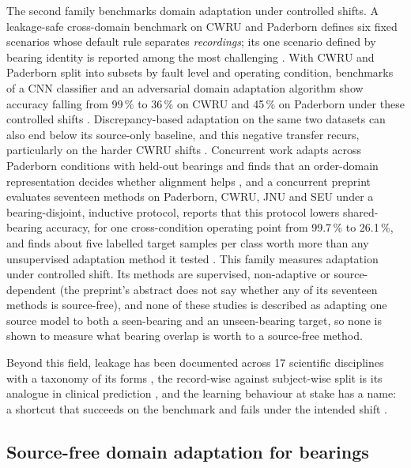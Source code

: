 The second family benchmarks domain adaptation under controlled shifts. A leakage-safe cross-domain benchmark on CWRU and
Paderborn defines six fixed scenarios whose default rule separates \emph{recordings}; its one scenario defined by bearing
identity is reported among the most challenging \cite{knap2026leakagesafe}. With CWRU and Paderborn split into subsets by
fault level and operating condition, benchmarks of a CNN classifier and an adversarial domain adaptation algorithm show accuracy falling from 99\,\% to 36\,\% on CWRU and
45\,\% on Paderborn under these controlled shifts \cite{farag2025benchmark}. Discrepancy-based adaptation on the same two datasets can also end below its source-only baseline, and this negative transfer recurs, particularly on the harder CWRU shifts \cite{knap2026negative}. Concurrent work adapts across Paderborn conditions with held-out
bearings and finds that an order-domain representation decides whether alignment helps \cite{nagaswetha2026}, and a
concurrent preprint evaluates seventeen methods on Paderborn, CWRU, JNU and SEU under a bearing-disjoint, inductive
protocol, reports that this protocol lowers shared-bearing accuracy, for one cross-condition operating point from 99.7\,\% to 26.1\,\%, and finds about five labelled target samples per class worth more than any unsupervised adaptation method it
tested \cite{duc2026recipe}. This family measures adaptation under controlled shift. Its methods are
supervised, non-adaptive or source-dependent (the preprint's abstract does not say whether any of its seventeen methods is source-free), and none of these studies is described as adapting one source model to both a seen-bearing and an unseen-bearing
target, so none is shown to measure what bearing overlap is worth to a source-free method.

Beyond this field, leakage has been documented across 17 scientific disciplines with a taxonomy of its forms
\cite{kapoor2023leakage}, the record-wise against subject-wise split is its analogue in clinical prediction
\cite{saeb2017}, and the learning behaviour at stake has a name: a shortcut that succeeds on the benchmark and fails under
the intended shift \cite{geirhos2020shortcut}.

\subsection{Source-free domain adaptation for bearings}


